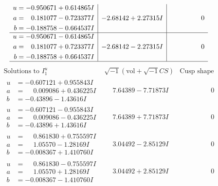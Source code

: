 \documentclass[1p]{elsarticle_modified}
\theoremstyle{definition}
\newcommand{\I}{\sqrt{-1}}
\begin{document}
$$\begin{array}{c|c|c}
\begin{aligned}
u &= -0.950671 + 0.614865 I \\
a &= \phantom{-}0.181077 - 0.723377 I \\
b &= -0.188758 - 0.664537 I\end{aligned}
 & -2.68142 + 2.27315 I & \phantom{-0.000000 } 0 \\ \hline\begin{aligned}
u &= -0.950671 - 0.614865 I \\
a &= \phantom{-}0.181077 + 0.723377 I \\
b &= -0.188758 + 0.664537 I\end{aligned}
 & -2.68142 - 2.27315 I & \phantom{-0.000000 } 0\\
 \hline 
 \end{array}$$\newpage$$\begin{array}{c|c|c}  
\text{Solutions to }I^u_{1}& \I (\text{vol} + \sqrt{-1}CS) & \text{Cusp shape}\\
 \hline 
\begin{aligned}
u &= -0.607121 + 0.955843 I \\
a &= \phantom{-}0.009086 + 0.436225 I \\
b &= -0.43896 - 1.43616 I\end{aligned}
 & \phantom{-}7.64389 - 7.71873 I & \phantom{-0.000000 } 0 \\ \hline\begin{aligned}
u &= -0.607121 - 0.955843 I \\
a &= \phantom{-}0.009086 - 0.436225 I \\
b &= -0.43896 + 1.43616 I\end{aligned}
 & \phantom{-}7.64389 + 7.71873 I & \phantom{-0.000000 } 0 \\ \hline\begin{aligned}
u &= \phantom{-}0.861830 + 0.755597 I \\
a &= \phantom{-}1.05570 - 1.28169 I \\
b &= -0.008367 + 1.410760 I\end{aligned}
 & \phantom{-}3.04492 - 2.85129 I & \phantom{-0.000000 } 0 \\ \hline\begin{aligned}
u &= \phantom{-}0.861830 - 0.755597 I \\
a &= \phantom{-}1.05570 + 1.28169 I \\
b &= -0.008367 - 1.410760 I\end{aligned}
 & \phantom{-}3.04492 + 2.85129 I & \phantom{-0.000000 } 0 \\ \hline\begin{aligned}

\end{aligned}
\end{array}$$
\end{document}
